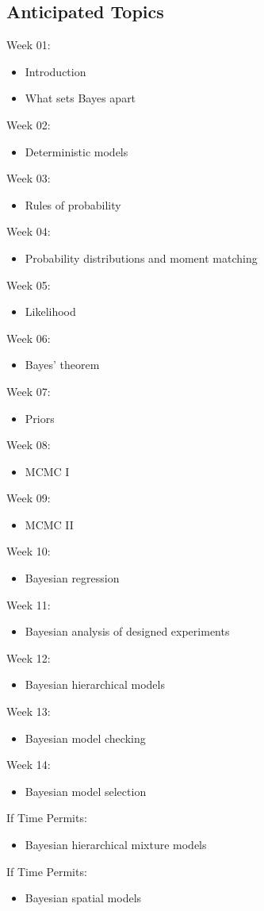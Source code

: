 \documentclass[11pt, a4paper]{article}
\begin{document}
\subsection*{Anticipated Topics}
Week 01: 
\begin{itemize}
\item Introduction
\item What sets Bayes apart
\end{itemize}
Week 02:
\begin{itemize}
\item Deterministic models
\end{itemize}
Week 03:
\begin{itemize}
\item Rules of probability
\end{itemize}
Week 04:
\begin{itemize}
\item Probability distributions and moment matching
\end{itemize}
Week 05:
\begin{itemize}
\item Likelihood
\end{itemize}
Week 06:
\begin{itemize}
\item Bayes' theorem
\end{itemize}
Week 07:
\begin{itemize}
\item Priors
\end{itemize}
Week 08:
\begin{itemize}
\item MCMC I
\end{itemize}
Week 09:
\begin{itemize}
\item MCMC II
\end{itemize}
Week 10:
\begin{itemize}
\item Bayesian regression
\end{itemize}
Week 11:
\begin{itemize}
\item Bayesian analysis of designed experiments
\end{itemize}
Week 12:
\begin{itemize}
\item Bayesian hierarchical models
\end{itemize}
Week 13:
\begin{itemize}
\item Bayesian model checking
\end{itemize}
Week 14:
\begin{itemize}
\item Bayesian model selection
\end{itemize}
If Time Permits:
\begin{itemize}
\item Bayesian hierarchical mixture models
\end{itemize}
If Time Permits:
\begin{itemize}
\item Bayesian spatial models
\end{itemize}
\end{document}
